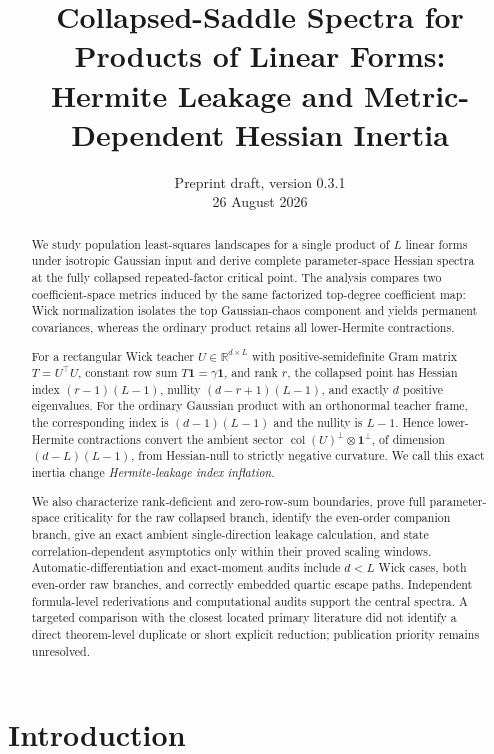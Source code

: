 \documentclass[11pt]{article}
\title{Collapsed-Saddle Spectra for Products of Linear Forms:\\
Hermite Leakage and Metric-Dependent Hessian Inertia}
\author{}
\date{Preprint draft, version 0.3.1\\26 August 2026}
\newcommand{\R}{\mathbb{R}}
\newcommand{\one}{\mathbf{1}}
\newcommand{\col}{\operatorname{col}}
\begin{document}
\maketitle

\begin{abstract}
We study population least-squares landscapes for a single product of $L$ linear forms under isotropic Gaussian input and derive complete parameter-space Hessian spectra at the fully collapsed repeated-factor critical point.  The analysis compares two coefficient-space metrics induced by the same factorized top-degree coefficient map: Wick normalization isolates the top Gaussian-chaos component and yields permanent covariances, whereas the ordinary product retains all lower-Hermite contractions.

For a rectangular Wick teacher $U\in\R^{d\times L}$ with positive-semidefinite Gram matrix $T=U^\top U$, constant row sum $T\one=\gamma\one$, and rank $r$, the collapsed point has Hessian index $(r-1)(L-1)$, nullity $(d-r+1)(L-1)$, and exactly $d$ positive eigenvalues.  For the ordinary Gaussian product with an orthonormal teacher frame, the corresponding index is $(d-1)(L-1)$ and the nullity is $L-1$.  Hence lower-Hermite contractions convert the ambient sector $\col(U)^\perp\otimes\one^\perp$, of dimension $(d-L)(L-1)$, from Hessian-null to strictly negative curvature.  We call this exact inertia change \emph{Hermite-leakage index inflation}.

We also characterize rank-deficient and zero-row-sum boundaries, prove full parameter-space criticality for the raw collapsed branch, identify the even-order companion branch, give an exact ambient single-direction leakage calculation, and state correlation-dependent asymptotics only within their proved scaling windows.  Automatic-differentiation and exact-moment audits include $d<L$ Wick cases, both even-order raw branches, and correctly embedded quartic escape paths.  Independent formula-level rederivations and computational audits support the central spectra.  A targeted comparison with the closest located primary literature did not identify a direct theorem-level duplicate or short explicit reduction; publication priority remains unresolved.
\end{abstract}

\tableofcontents

\section{Introduction}
\end{document}
